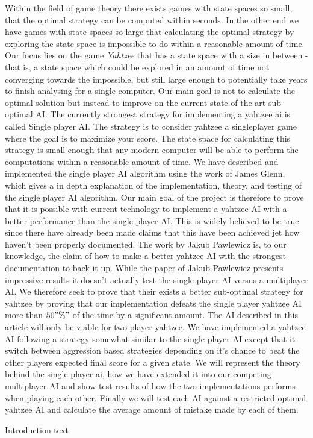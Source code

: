 Within the field of game theory there exists games with state spaces so small, that the optimal strategy can be computed within seconds. In the other end we have games with state spaces so large that calculating the optimal strategy by exploring the state space is impossible to do within a reasonable amount of time. Our focus lies on the game \emph{Yahtzee} that has a state space with a size in between - that is, a state space which could be explored in an amount of time not converging towards the impossible, but still large enough to potentially take years to finish analysing for a single computer. Our main goal is not to calculate the optimal solution but instead to improve on the current state of the art sub-optimal AI. The currently strongest strategy for implementing a yahtzee ai is called Single player AI. The strategy is to consider yahtzee a singleplayer game where the goal is to maximize your score. The state space for calculating this strategy is small enough that any modern computer will be able to perform the computations within a reasonable amount of time. We have described and implemented the single player AI algorithm using the work of James Glenn\cite{glenn2006optimal}, which gives a in depth explanation of the implementation, theory, and testing of the single player AI algorithm.\newline \hspace*{20px} Our main goal of the project is therefore to prove that it is possible with current technology to implement a yahtzee AI with a better performance than the single player AI. This is widely believed to be true since there have already been made claims that this have been achieved jet how haven't been properly documented. The work by Jakub Pawlewicz is, to our knowledge, the claim of how to make a  better yahtzee AI with the strongest documentation to back it up. While the paper of Jakub Pawlewicz presents impressive results it doesn't actually test the single player AI versus a multiplayer AI. We therefore seek to prove that their exists a better sub-optimal strategy for yahtzee by proving that our implementation defeats the single player yahtzee AI more than $50"\%" $ of the time by a significant amount. The AI described in this article will only be viable for two player yahtzee.\newline \hspace*{20px} We have implemented a yahtzee AI following a strategy somewhat similar to the single player AI except that it switch between aggression based strategies depending on it's chance to beat the other players expected final score for a given state. We will represent the theory behind the single player ai, how we have extended it into our competing multiplayer AI and show test results of how the two implementations performs when playing each other. Finally we will test each AI against a restricted optimal yahtzee AI and calculate the average amount of mistake made by each of them.

Introduction text
